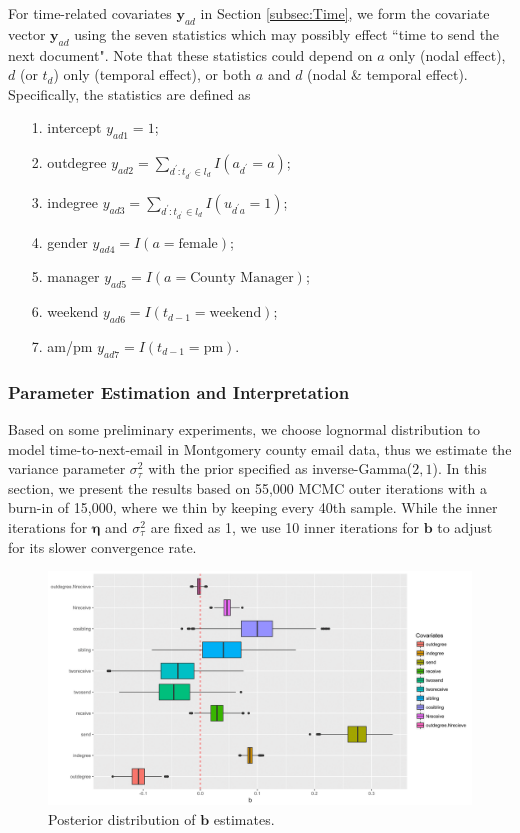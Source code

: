 \documentclass[12pt]{article}
\begin{document}
For time-related covariates $\boldsymbol{y}_{ad}$ in Section \ref{subsec:Time}, we form the covariate vector $\boldsymbol{y}_{ad}$ using the seven statistics which may possibly effect ``time to send the next document". Note that these statistics could depend on $a$ only (nodal effect), $d$ (or $t_d$) only (temporal effect), or both $a$ and $d$ (nodal \& temporal effect). Specifically, the statistics are defined as
\begin{itemize}
	\item[1.] intercept ${y}_{ad1} =1$;
	\item[2.] outdegree ${y}_{ad2} =\sum\limits_{d^\prime: t_{d^\prime} \in l_d} I(a_{d^\prime} = a)$;
	\item[3.] indegree ${y}_{ad3}=\sum\limits_{d^\prime: t_{d^\prime} \in l_d} I(u_{d^\prime a} = 1)$;
	\item[4.] gender ${y}_{ad4}=I(a= \mbox{female})$;
	\item[5.] manager ${y}_{ad5}=I(a= \mbox{County Manager})$;
	\item[6.] weekend ${y}_{ad6} = I(t_{d-1}= \mbox{weekend})$;
	\item[7.] am/pm ${y}_{ad7}= I(t_{d-1}= \mbox{pm})$.
\end{itemize}
\subsubsection{Parameter Estimation and Interpretation}\label{subsubsec:Result_email}
Based on some preliminary experiments, we choose lognormal distribution to model time-to-next-email in Montgomery county email data, thus we estimate the variance parameter $\sigma_\tau^2$ with the prior specified as inverse-Gamma($2, 1$). In this section, we present the results based on 55,000 MCMC outer iterations with a burn-in of 15,000, where we thin by keeping every 40th sample. While the inner iterations for $\boldsymbol{\eta}$ and $\sigma_\tau^2$ are fixed as 1, we use 10 inner iterations for $\boldsymbol{b}$ to adjust for its slower convergence rate.
	\begin{figure}[!b]
	\centering
	\includegraphics[width=1\textwidth]{plots_paper/best-1.png}	
	\caption {Posterior distribution of $\boldsymbol{b}$ estimates.}
	\label{figure:betaresults}
\end{figure}
	
\end{document}
